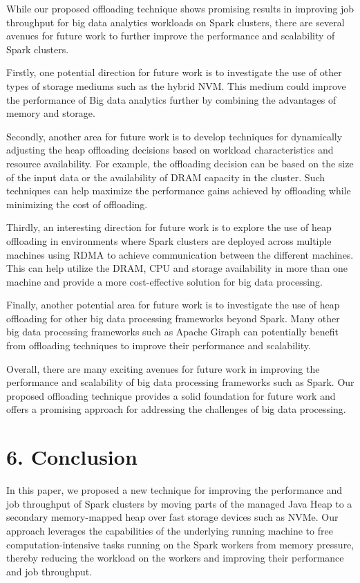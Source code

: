 \documentclass[twocolumn,10pt]{asme2e}
\begin{document}
While our proposed offloading technique shows promising results in improving job throughput for big data analytics workloads on Spark clusters, there are several avenues for future work to further improve the performance and scalability of Spark clusters. 

Firstly, one potential direction for future work is to investigate the use of other types of storage mediums such as the hybrid NVM. This medium could improve the performance of Big data analytics further by combining the advantages of memory and storage.

Secondly, another area for future work is to develop techniques for dynamically adjusting the heap offloading decisions based on workload characteristics and resource availability. For example, the offloading decision can be based on the size of the input data or the availability of DRAM capacity in the cluster. Such techniques can help maximize the performance gains achieved by offloading while minimizing the cost of offloading.

Thirdly, an interesting direction for future work is to explore the use of heap offloading in environments where Spark clusters are deployed across multiple machines using RDMA to achieve communication between the different machines. This can help utilize the DRAM, CPU and storage availability in more than one machine and provide a more cost-effective solution for big data processing.

Finally, another potential area for future work is to investigate the use of heap offloading for other big data processing frameworks beyond Spark. Many other big data processing frameworks such as Apache Giraph can potentially benefit from offloading techniques to improve their performance and scalability.

Overall, there are many exciting avenues for future work in improving the performance and scalability of big data processing frameworks such as Spark. Our proposed offloading technique provides a solid foundation for future work and offers a promising approach for addressing the challenges of big data processing.

\section*{6. Conclusion}

In this paper, we proposed a new technique for improving the performance and job throughput of Spark clusters by moving parts of the managed Java Heap to a secondary memory-mapped heap over fast storage devices such as NVMe. Our approach leverages the capabilities of the underlying running machine to free computation-intensive tasks running on the Spark workers from memory pressure, thereby reducing the workload on the workers and improving their performance and job throughput.
\end{document}

